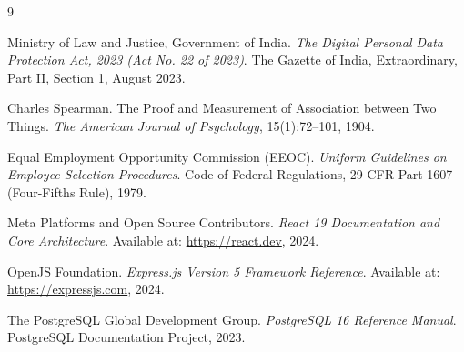 \documentclass[11pt,a4paper,oneside]{report}
\begin{document}
\newpage
\begin{thebibliography}{9}

Ministry of Law and Justice, Government of India.
\newblock \textit{The Digital Personal Data Protection Act, 2023 (Act No. 22 of 2023)}.
\newblock The Gazette of India, Extraordinary, Part II, Section 1, August 2023.

Charles Spearman.
\newblock The Proof and Measurement of Association between Two Things.
\newblock \textit{The American Journal of Psychology}, 15(1):72--101, 1904.

Equal Employment Opportunity Commission (EEOC).
\newblock \textit{Uniform Guidelines on Employee Selection Procedures}.
\newblock Code of Federal Regulations, 29 CFR Part 1607 (Four-Fifths Rule), 1979.

Meta Platforms and Open Source Contributors.
\newblock \textit{React 19 Documentation and Core Architecture}.
\newblock Available at: \href{https://react.dev}{https://react.dev}, 2024.

OpenJS Foundation.
\newblock \textit{Express.js Version 5 Framework Reference}.
\newblock Available at: \href{https://expressjs.com}{https://expressjs.com}, 2024.

The PostgreSQL Global Development Group.
\newblock \textit{PostgreSQL 16 Reference Manual}.
\newblock PostgreSQL Documentation Project, 2023.

\end{thebibliography}
\end{document}
